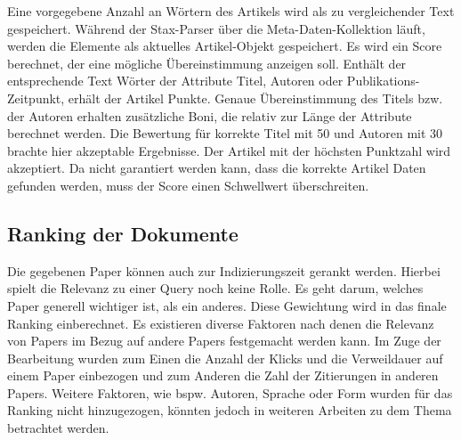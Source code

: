 Eine vorgegebene Anzahl an Wörtern des Artikels wird als zu
vergleichender Text gespeichert. Während der Stax-Parser über die
Meta-Daten-Kollektion läuft, werden die Elemente als aktuelles 
Artikel-Objekt gespeichert. Es wird ein Score berechnet, der eine
mögliche Übereinstimmung anzeigen soll. Enthält der entsprechende Text Wörter der
Attribute Titel, Autoren oder Publikations-Zeitpunkt, erhält der Artikel Punkte. Genaue Übereinstimmung des
Titels bzw. der Autoren erhalten zusätzliche Boni, die relativ zur
Länge der Attribute berechnet werden. Die Bewertung für korrekte Titel mit 50 und Autoren mit 30 brachte hier akzeptable Ergebnisse. Der Artikel mit der höchsten Punktzahl wird akzeptiert. Da
nicht garantiert werden kann, dass die korrekte Artikel Daten gefunden
werden, muss der Score einen Schwellwert überschreiten.

\subsection{Ranking der Dokumente}\label{sec:ranking}


Die gegebenen Paper können auch zur Indizierungszeit gerankt werden. Hierbei spielt die Relevanz zu einer Query noch keine Rolle. Es geht darum, welches Paper generell wichtiger ist, als ein anderes. Diese Gewichtung wird in das finale Ranking einberechnet.
Es existieren diverse Faktoren nach denen die Relevanz von Papers im Bezug auf andere Papers festgemacht werden kann. Im Zuge der Bearbeitung wurden zum Einen die Anzahl der Klicks und die Verweildauer auf einem Paper einbezogen und zum Anderen die Zahl der Zitierungen in anderen Papers. Weitere Faktoren, wie bspw. Autoren, Sprache oder Form wurden für das Ranking nicht hinzugezogen, könnten jedoch in weiteren Arbeiten zu dem Thema betrachtet werden.  \\

